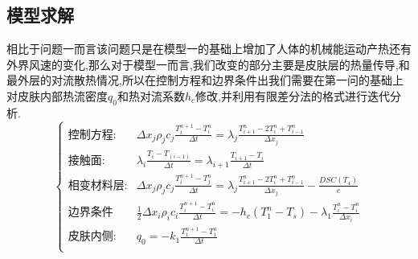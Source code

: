 \documentclass{whutmod}
\begin{document}
\subsection{模型求解}
相比于问题一而言该问题只是在模型一的基础上增加了人体的机械能运动产热还有外界风速的变化,那么对于模型一而言,我们改变的部分主要是皮肤层的热量传导,和最外层的对流散热情况,所以在控制方程和边界条件出我们需要在第一问的基础上对皮肤内部热流密度$q_0$和热对流系数$h_c$修改,并利用有限差分法的格式进行迭代分析.
\begin{equation}
\begin{cases}
\text{控制方程:}&
	\Delta x_j \rho_j c_j \frac{T_i^{n+1}-T_i^{n}}{\Delta t}=\lambda_j \frac{T_{i+1}^n-2T_i^n+T_{i-1}^n}{\Delta x_j}\\

\text{接触面:}& \lambda_i \frac{T_i-T_(i-1)}{\Delta t}=\lambda_{i+1} \frac{T_{i+1}-T_{i}}{\Delta t}\\

\text{相变材料层:}& \Delta x_j \rho_j c_j \frac{T_i^{n+1}-T_j^{n}}{\Delta t}=\lambda_j \frac{T_{i+1}^n-2T_i^n+T_{i-1}^n}{\Delta x_j}-\frac{DSC(T_4)}{c}\\

\text{边界条件}&\frac{1}{2} \Delta x_{i} \rho_{i} c_{i} \frac{T_{i}^{n+1}-T_{i}^{n}}{\Delta t}=-h_{c}\left(T_{1}^{n}-T_{s}\right)-\lambda_{1} \frac{T_{i}^{n}-T_{i}^{n}}{\Delta x_{i}}\\

\text{皮肤内侧:}&q_0=-k_{1}\frac{T_1^{n+1}-T_1^n}{\Delta t}\\
\end{cases}
\end{equation}
\end{document}
